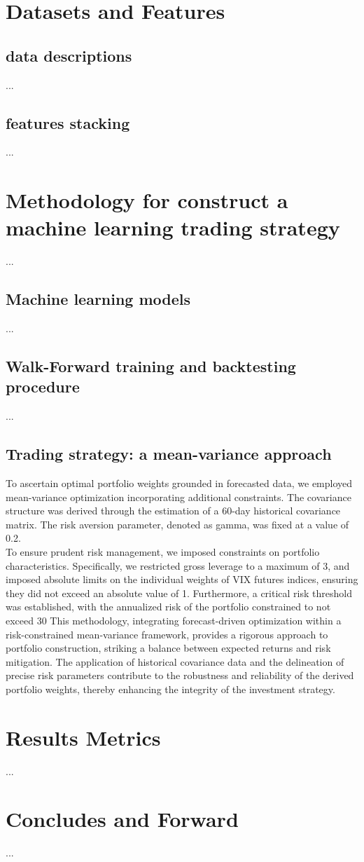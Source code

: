 \documentclass{rQUF2e}
\theoremstyle{plain}
\theoremstyle{definition}
\theoremstyle{remark}
\begin{document}
\section{Datasets and Features}

\subsection{data descriptions}
...
\subsection{features stacking}
...

\section{Methodology for construct a machine learning trading strategy}
...

\subsection{Machine learning models}
...
\subsection{Walk-Forward training and backtesting procedure}
...
\subsection{Trading strategy: a mean-variance approach}
To ascertain optimal portfolio weights grounded in forecasted data, we employed mean-variance optimization incorporating additional constraints. The covariance structure was derived through the estimation of a 60-day historical covariance matrix. The risk aversion parameter, denoted as gamma, was fixed at a value of 0.2.\\
To ensure prudent risk management, we imposed constraints on portfolio characteristics. Specifically, we restricted gross leverage to a maximum of 3, and imposed absolute limits on the individual weights of VIX futures indices, ensuring they did not exceed an absolute value of 1. Furthermore, a critical risk threshold was established, with the annualized risk of the portfolio constrained to not exceed 30%
This methodology, integrating forecast-driven optimization within a risk-constrained mean-variance framework, provides a rigorous approach to portfolio construction, striking a balance between expected returns and risk mitigation. The application of historical covariance data and the delineation of precise risk parameters contribute to the robustness and reliability of the derived portfolio weights, thereby enhancing the integrity of the investment strategy.

\section{Results Metrics}
...

\section{Concludes and Forward}
...
\end{document}
